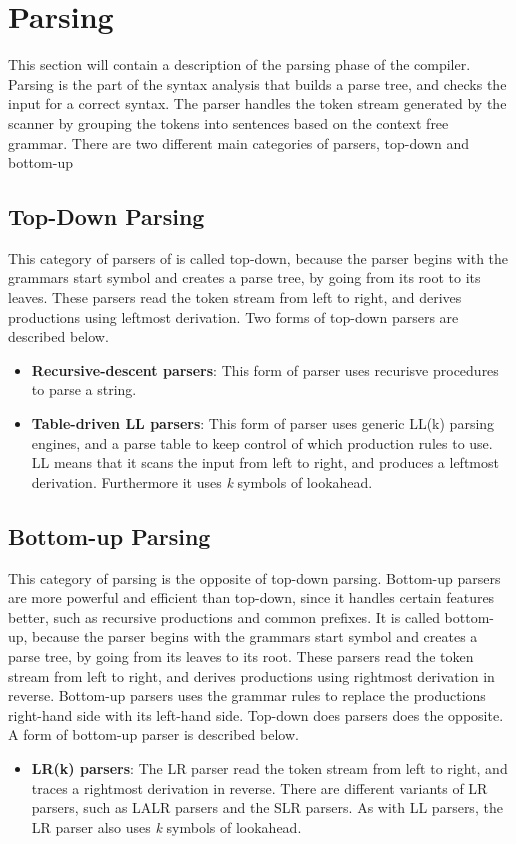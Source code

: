 \section{Parsing}
This section will contain a description of the parsing phase of the compiler. 
\\Parsing is the part of the syntax analysis that builds a parse tree, and checks the input for a correct syntax. The parser handles the token stream generated by the scanner by grouping the tokens into sentences based on the context free grammar. There are two different main categories of parsers, top-down and bottom-up

\subsection{Top-Down Parsing}
This category of parsers of is called top-down, because the parser begins with the grammars start symbol and creates a parse tree, by going from its root to its leaves. These parsers read the token stream from left to right, and derives productions using leftmost derivation. Two forms of top-down parsers are described below. 

\begin{itemize}
\item \textbf{Recursive-descent parsers}: This form of parser uses recurisve procedures to parse a string. 
\item \textbf{Table-driven LL parsers}: This form of parser uses generic LL(k) parsing engines, and a parse table to keep control of which production rules to use. LL means that it scans the input from left to right, and produces a leftmost derivation. Furthermore it uses \textit{k} symbols of lookahead. 
\end{itemize}

\subsection{Bottom-up Parsing}
This category of parsing is the opposite of top-down parsing. Bottom-up parsers are more powerful and efficient than top-down, since it handles certain features better, such as recursive productions and common prefixes. It is called bottom-up, because the parser begins with the grammars start symbol and creates a parse tree, by going from its leaves to its root. These parsers read the token stream from left to right, and derives productions using rightmost derivation in reverse. Bottom-up parsers uses the grammar rules to replace the productions right-hand side with its left-hand side. Top-down does parsers does the opposite. A form of bottom-up parser is described below. 

\begin{itemize}
\item \textbf{LR(k) parsers}: The LR parser read the token stream from left to right, and traces a rightmost derivation in reverse. There are different variants of LR parsers, such as LALR parsers and the SLR parsers. As with LL parsers, the LR parser also uses \textit{k} symbols of lookahead.  
\end{itemize}
